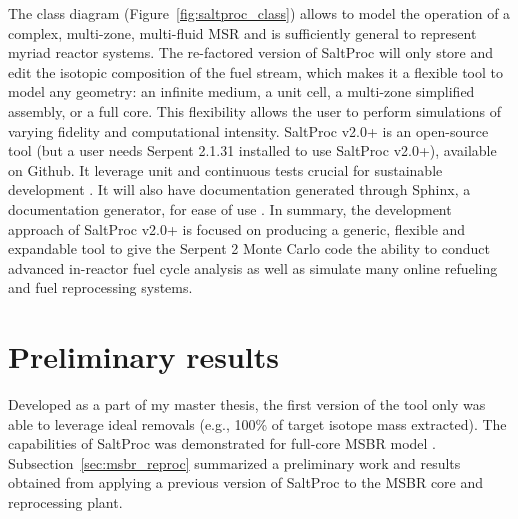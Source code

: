 The class diagram (Figure~\ref{fig:saltproc_class}) allows to model the 
operation of a complex, multi-zone, multi-fluid \gls{MSR} and is sufficiently 
general to represent myriad reactor systems. The re-factored version of 
SaltProc will only store and edit the isotopic composition of the fuel stream, 
which makes it a flexible tool to model any geometry: an infinite medium, a 
unit cell, a multi-zone simplified assembly, or a full core. This flexibility 
allows the user to perform simulations of varying fidelity and computational 
intensity. SaltProc v2.0+ is an open-source tool (but a user needs Serpent 
2.1.31 installed to use SaltProc v2.0+), available on Github. It leverage unit 
and continuous tests  crucial for sustainable development  
\cite{krekel_pytest_2004}. It will also have documentation generated through 
Sphinx, a documentation generator, for ease of use \cite{brandl_sphinx_2009}. 
In summary, the development approach of SaltProc v2.0+ is focused on producing 
a generic, flexible and expandable tool to give the Serpent 2 Monte Carlo code 
the ability to conduct advanced in-reactor fuel cycle analysis as well as 
simulate many online refueling and fuel reprocessing systems.


\section{Preliminary results}
Developed as a part of my master thesis, the first version of the tool only 
was able to leverage ideal removals (e.g., 100\% of target isotope mass 
extracted). The capabilities of SaltProc was demonstrated for full-core 
\gls{MSBR} model \cite{rykhlevskii_modeling_2019}. 
Subsection~\ref{sec:msbr_reproc} summarized a preliminary work and results 
obtained from applying a previous version of SaltProc to the \gls{MSBR} core 
and reprocessing plant.

